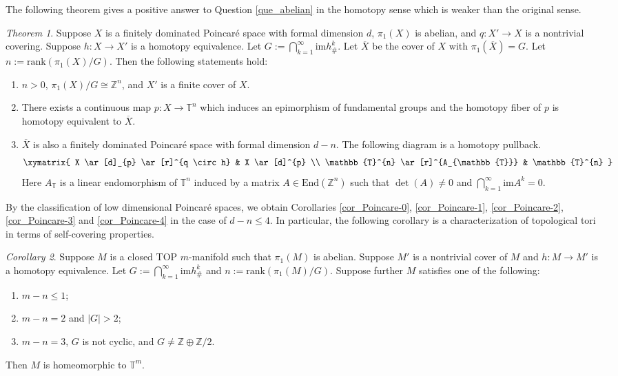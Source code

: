 \documentclass[12pt]{amsart}
\theoremstyle{plain}
\theoremstyle{definition}
\theoremstyle{question}
\theoremstyle{remark}
\theoremstyle{assumption}
\numberwithin{equation}{section}
\theoremstyle{bigthm}
\newtheorem{bigthm}{Theorem}
\newtheorem{bigcor}[bigthm]{Corollary}
\begin{document}
The following theorem gives a positive answer to Question \ref{que_abelian} in the homotopy sense which is weaker than the original sense.
\begin{bigthm}\label{thm_Poincare}
Suppose $X$ is a finitely dominated Poincar\'e space with formal dimension $d$, $\pi_{1} (X)$ is abelian, and $q \colon  X' \rightarrow X$ is a nontrivial covering. Suppose $h \colon  X \rightarrow X'$ is a homotopy equivalence. Let $G := \bigcap_{k=1}^{\infty} \mathrm{im} h_{\#}^{k}$. Let $\overline{X}$ be the cover of $X$ with $\pi_{1} (\overline{X}) =G$. Let $n := \mathrm{rank} (\pi_{1} (X) / G)$. Then the following statements hold:
\begin{enumerate}
\item $n>0$, $\pi_{1} (X) / G \cong \mathbb{Z}^{n}$, and $X'$ is a finite cover of $X$.

\item There exists a continuous map $p \colon  X \rightarrow \mathbb{T}^{n}$ which induces an epimorphism of fundamental groups and the homotopy fiber of $p$ is homotopy equivalent to $\overline{X}$.

\item $\overline{X}$ is also a finitely dominated Poincar\'{e} space with formal dimension $d-n$. The following diagram is a homotopy pullback.
\begin{equation}\label{thm_Poincare_1}
\xymatrix{
  X \ar[d]_{p} \ar[r]^{q \circ h} & X \ar[d]^{p} \\
  \mathbb{T}^{n} \ar[r]^{A_{\mathbb{T}}} & \mathbb{T}^{n}   }
\end{equation}
Here $A_{\mathbb{T}}$ is a linear endomorphism of $\mathbb{T}^{n}$ induced by a matrix $A \in \mathrm{End} (\mathbb{Z}^{n})$ such that $\det (A) \neq 0$ and $\bigcap_{k=1}^{\infty} \mathrm{im} A^{k} =0$.
\end{enumerate}
\end{bigthm}

By the classification of low dimensional Poincar\'{e} spaces, we obtain Corollaries \ref{cor_Poincare-0}, \ref{cor_Poincare-1}, \ref{cor_Poincare-2}, \ref{cor_Poincare-3} and \ref{cor_Poincare-4} in the case of $d-n \le 4$. In particular, the following corollary is a characterization of topological tori in terms of self-covering properties.

\begin{bigcor}\label{cor_torus}
Suppose $M$ is a closed TOP $m$-manifold such that $\pi_{1} (M)$ is abelian. Suppose $M'$ is a nontrivial cover of $M$ and $h \colon  M \rightarrow M'$ is a homotopy equivalence. Let $G := \bigcap_{k=1}^{\infty} \mathrm{im} h_{\#}^{k}$ and $n := \mathrm{rank} (\pi_{1} (M) / G)$. Suppose further $M$ satisfies one of the following:
\begin{enumerate}
\item $m -n \leq 1$;

\item $m-n = 2$ and $|G| > 2$;

\item $m-n = 3$, $G$ is not cyclic, and $G \ne \mathbb{Z} \oplus \mathbb{Z}/2$.
\end{enumerate}
Then $M$ is homeomorphic to $\mathbb{T}^{m}$.
\end{bigcor}
\end{document}
